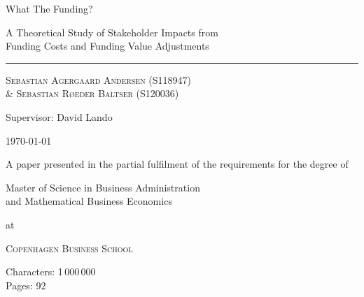 \documentclass[main.tex]{subfiles}
\begin{document}
	\begin{titlepage}
		\centering
		\vspace{5cm}
		{\fontsize{48pt}{1pt}\selectfont What The Funding? \par}
		\vspace{0.5cm}
		{\Large A Theoretical Study of Stakeholder Impacts from \\ 
				Funding Costs and Funding Value Adjustments \par}
		\rule{\textwidth}{1px}\par
		{\scshape\large 
			Sebastian Agergaard Andersen {\scriptsize(S118947)} \\
			\& Sebastian Røeder Baltser {\scriptsize(S120036)}
		\par}
		Supervisor: David Lando \\
		
		\vfill
		
		{\Large \today \par}		
		{A paper presented in the partial fulfilment
		of the requirements for the degree of \\}
		{\Large Master of Science in Business Administration \\
				and Mathematical Business Economics \par}
		at \par 
		{\scshape\LARGE Copenhagen Business School\par}
		\vspace{0.5cm}
		Characters: 1\,000\,000 \\
		Pages: 92
		
		\thispagestyle{empty}
	\end{titlepage}
\end{document}
